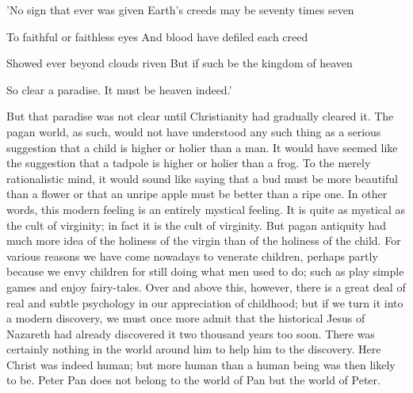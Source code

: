 'No sign that ever was given Earth's creeds may be seventy times seven

To faithful or faithless eyes And blood have defiled each creed

Showed ever beyond clouds riven But if such be the kingdom of heaven

So clear a paradise. It must be heaven indeed.'

But that paradise was not clear until Christianity had gradually cleared it. The pagan world, as such, would not have understood any such thing as a serious suggestion that a child is higher or holier than a man. It would have seemed like the suggestion that a tadpole is higher or holier than a frog. To the merely rationalistic mind, it would sound like saying that a bud must be more beautiful than a flower or that an unripe apple must be better than a ripe one. In other words, this modern feeling is an entirely mystical feeling. It is quite as mystical as the cult of virginity; in fact it is the cult of virginity. But pagan antiquity had much more idea of the holiness of the virgin than of the holiness of the child. For various reasons we have come nowadays to venerate children, perhaps partly because we envy children for still doing what men used to do; such as play simple games and enjoy fairy-tales. Over and above this, however, there is a great deal of real and subtle psychology in our appreciation of childhood; but if we turn it into a modern discovery, we must once more admit that the historical Jesus of Nazareth had already discovered it two thousand years too soon. There was certainly nothing in the world around him to help him to the discovery. Here Christ was indeed human; but more human than a human being was then likely to be. Peter Pan does not belong to the world of Pan but the world of Peter.

